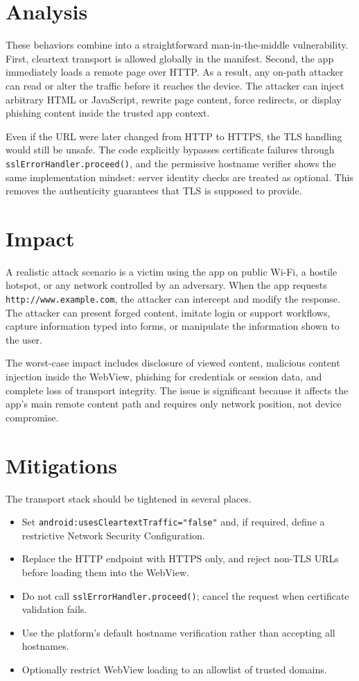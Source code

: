 \documentclass[10pt,twocolumn,letterpaper]{article}
\begin{document}
\section{Analysis}
These behaviors combine into a straightforward man-in-the-middle vulnerability. First, cleartext transport is allowed globally in the manifest. Second, the app immediately loads a remote page over HTTP. As a result, any on-path attacker can read or alter the traffic before it reaches the device. The attacker can inject arbitrary HTML or JavaScript, rewrite page content, force redirects, or display phishing content inside the trusted app context.

Even if the URL were later changed from HTTP to HTTPS, the TLS handling would still be unsafe. The code explicitly bypasses certificate failures through \texttt{sslErrorHandler.proceed()}, and the permissive hostname verifier shows the same implementation mindset: server identity checks are treated as optional. This removes the authenticity guarantees that TLS is supposed to provide.

\section{Impact}
A realistic attack scenario is a victim using the app on public Wi-Fi, a hostile hotspot, or any network controlled by an adversary. When the app requests \texttt{http://www.example.com}, the attacker can intercept and modify the response. The attacker can present forged content, imitate login or support workflows, capture information typed into forms, or manipulate the information shown to the user.

The worst-case impact includes disclosure of viewed content, malicious content injection inside the WebView, phishing for credentials or session data, and complete loss of transport integrity. The issue is significant because it affects the app's main remote content path and requires only network position, not device compromise.

\section{Mitigations}
The transport stack should be tightened in several places.

\begin{itemize}
  \item Set \texttt{android:usesCleartextTraffic="false"} and, if required, define a restrictive Network Security Configuration.
  \item Replace the HTTP endpoint with HTTPS only, and reject non-TLS URLs before loading them into the WebView.
  \item Do not call \texttt{sslErrorHandler.proceed()}; cancel the request when certificate validation fails.
  \item Use the platform's default hostname verification rather than accepting all hostnames.
  \item Optionally restrict WebView loading to an allowlist of trusted domains.
\end{itemize}
\end{document}
